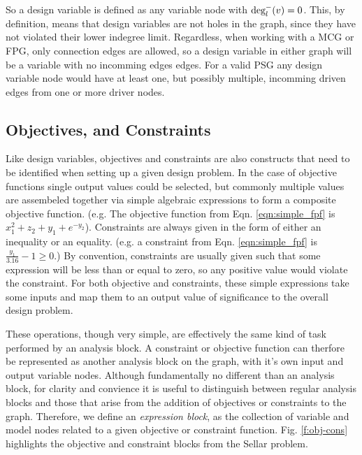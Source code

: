 So a design variable is defined as any variable node with $\textrm{deg}_l^-(v)=0$. 
This, by definition, means that design variables are not holes in the graph, since 
they have not violated their lower indegree limit. Regardless, 
when working with a MCG or FPG, only connection edges are allowed, so a design 
variable in either graph will be a variable with no incomming edges edges. For a valid PSG 
any design variable node would have at least one, but possibly multiple, incomming 
driven edges from one or more driver nodes. 

\subsection{Objectives, and Constraints}
\label{ss:objectives and constraints}
Like design variables, objectives and constraints are also constructs that need 
to be identified when setting up a given design problem. In the case of 
objective functions single output values could be selected, but commonly multiple 
values are assembeled together via simple algebraic expressions to form a composite 
objective function. (e.g. The objective function from Eqn. \ref{eqn:simple_fpf} is
$x_1^2+z_2+y_1+e^{-y_2}$). Constraints are always given in the 
form of either an inequality or an equality. (e.g. a constraint from Eqn. 
\ref{eqn:simple_fpf} is $\frac{y_1}{3.16}-1\geq0$.) By convention, 
constraints are usually given such that some expression will be less than or equal 
to zero, so any positive value would violate the constraint. For both objective 
and constraints, these simple expressions take some inputs and map them to an
output value of significance to the overall design problem. 

These operations, though very simple, are effectively the same kind of task 
performed by an analysis block. A constraint or objective function can therfore 
be represented as another analysis block on the graph, with it's own input and 
output variable nodes. Although fundamentally no different than an analysis block, 
for clarity and convience it is useful to distinguish between regular analysis 
blocks and those that arise from the addition of objectives or constraints to 
the graph. Therefore, we define an \emph{expression block}, as the collection of variable and model 
nodes related to a given objective or constraint function. Fig. \ref{f:obj-cons}
highlights the objective and constraint blocks from the Sellar problem. 



